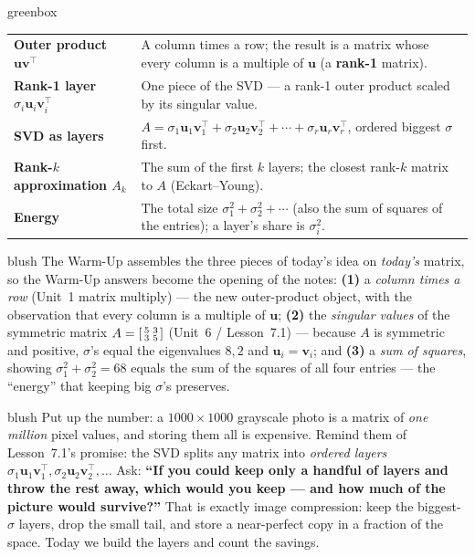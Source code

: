 \documentclass[10pt]{article}
\newcommand{\uu}{\mathbf{u}}
\newcommand{\vv}{\mathbf{v}}
\newcommand{\T}{^{\top}}
\begin{document}
\begin{skillbox}{greenbox}
\renewcommand{\arraystretch}{1.3}
\begin{tabularx}{\linewidth}{@{}l X@{}}
\textbf{Outer product $\uu\vv\T$} & A column times a row; the result is a matrix whose every column is a multiple of $\uu$ (a \textbf{rank-1} matrix). \\
\textbf{Rank-1 layer $\sigma_i\uu_i\vv_i\T$} & One piece of the SVD --- a rank-1 outer product scaled by its singular value. \\
\textbf{SVD as layers} & $A=\sigma_1\uu_1\vv_1\T+\sigma_2\uu_2\vv_2\T+\cdots+\sigma_r\uu_r\vv_r\T$, ordered biggest $\sigma$ first. \\
\textbf{Rank-$k$ approximation $A_k$} & The sum of the first $k$ layers; the closest rank-$k$ matrix to $A$ (Eckart--Young). \\
\textbf{Energy} & The total size $\sigma_1^2+\sigma_2^2+\cdots$ (also the sum of squares of the entries); a layer's share is $\sigma_i^2$. \\
\end{tabularx}
\end{skillbox}

\begin{fixedskillbox}{blush}
    The Warm-Up assembles the three pieces of today's idea on \emph{today's} matrix, so the Warm-Up answers
    become the opening of the notes: \textbf{(1)} a \emph{column times a row} (Unit~1 matrix multiply) ---
    the new outer-product object, with the observation that every column is a multiple of $\uu$;
    \textbf{(2)} the \emph{singular values} of the symmetric matrix $A=\begin{bsmallmatrix} 5 & 3\\ 3 & 5 \end{bsmallmatrix}$
    (Unit~6 / Lesson~7.1) --- because $A$ is symmetric and positive, $\sigma$'s equal the eigenvalues
    $8,2$ and $\uu_i=\vv_i$; and \textbf{(3)} a \emph{sum of squares}, showing $\sigma_1^2+\sigma_2^2=68$
    equals the sum of the squares of all four entries --- the ``energy'' that keeping big $\sigma$'s preserves.
\end{fixedskillbox}

\begin{skillbox}[Hook]{blush}
    Put up the number: a $1000\times1000$ grayscale photo is a matrix of \emph{one million} pixel values, and
    storing them all is expensive. Remind them of Lesson~7.1's promise: the SVD splits any matrix into
    \emph{ordered layers} $\sigma_1\uu_1\vv_1\T,\sigma_2\uu_2\vv_2\T,\dots$ Ask: \textbf{``If you could keep
    only a handful of layers and throw the rest away, which would you keep --- and how much of the picture
    would survive?''} That is exactly image compression: keep the biggest-$\sigma$ layers, drop the small
    tail, and store a near-perfect copy in a fraction of the space. Today we build the layers and count the
    savings.
\end{skillbox}
\end{document}
